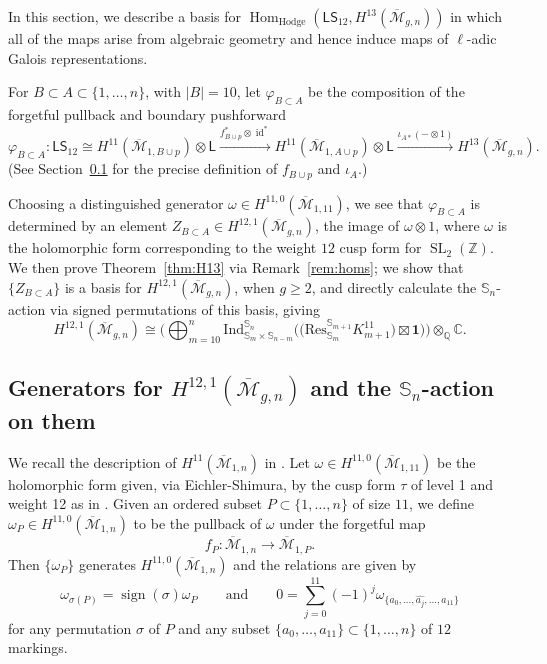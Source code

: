 \documentclass[12pt]{amsart}
\theoremstyle{definition}
\numberwithin{equation}{section}
\newcommand{\s}{\mathsf{S}}
\renewcommand{\l}{\mathsf{L}}
\newcommand{\zz}{\mathbb{Z}}
\renewcommand{\ss}{\mathbb{S}}
\newcommand{\M}{\mathcal{M}}
\DeclareMathOperator{\SL}{SL}
\DeclareMathOperator{\id}{id}
\DeclareMathOperator{\Hom}{Hom}
\DeclareMathOperator{\sign}{sign}
\newcommand{\CC}{\mathbb{C}}
\newcommand{\Q}{\mathbb{Q}}
\newcommand{\Ind}{\mathrm{Ind}}
\newcommand{\lstw}{\mathsf{L}\mathsf{S}_{12}}
\newcommand{\Mb}{\overline{\M}}
\theoremstyle{definition} %
\theoremstyle{remark}
\begin{document}
In this section, we describe a basis for $\Hom_{\mathrm{Hodge}}(\l \s_{12}, H^{13}(\Mb_{g,n}))$ in which all of the maps arise from algebraic geometry and hence induce maps of $\ell$-adic Galois representations. 

For $B \subset A \subset \{1, \ldots, n\}$, with $|B| = 10$, let $\varphi_{B \subset A}$ be the composition of the forgetful pullback and boundary pushforward 
\begin{equation} \label{dba} 
\varphi_{B \subset A} \colon \lstw \cong  H^{11}(\Mb_{1,B \cup p}) \otimes \mathsf{L} \xrightarrow{f_{B \cup p}^* \otimes \id^*} H^{11}(\Mb_{1,A \cup p}) \otimes \mathsf{L} \xrightarrow{\iota_{A*}( - \otimes 1)} H^{13}(\Mb_{g,n}).
\end{equation}
(See Section~\ref{candidate} for the precise definition of $f_{B \cup p}$ and $\iota_A$.) 

Choosing a distinguished generator $\omega \in H^{11,0}(\Mb_{1,11})$, we see that $\varphi_{B \subset A}$ is determined by an element $Z_{B \subset A} \in H^{12,1}(\Mb_{g,n})$, the image of $\omega \otimes 1$, where $\omega$ is the holomorphic form corresponding to the weight $12$ cusp form for $\SL_2(\zz)$. We then prove Theorem~\ref{thm:H13} via Remark~\ref{rem:homs}; we show that $\{ Z_{B \subset A} \}$ is a basis for $H^{12,1}(\Mb_{g,n})$, when $g \geq 2$, and directly calculate the $\ss_n$-action via signed permutations of this basis, giving $$H^{12,1}(\Mb_{g,n}) \cong \bigg ( \bigoplus_{m = 10}^n \Ind_{\ss_m \times \ss_{n-m}}^{\ss_n} \Big(\big(\mathrm{Res}^{\ss_{m+1}}_{\ss_m}K^{11}_{m+1}\big) \boxtimes \mathbf{1}\Big) \bigg) \otimes_\Q \CC.$$


\subsection{Generators for \texorpdfstring{$H^{12,1}(\Mb_{g,n})$ and the $\mathbb{S}_n$-action on them}{H13}}\label{candidate}
We recall the description of $H^{11}(\Mb_{1,n})$ in \cite[Proposition 2.3]{CanningLarsonPayne}. Let $\omega \in H^{11,0}(\Mb_{1,11})$ be the holomorphic form given, via Eichler-Shimura, by the cusp form $\tau$ of level 1 and weight 12 as in \cite[\S2]{FaberPandharipande13}. Given an ordered subset $P \subset \{1, \ldots, n\}$ of size $11$, we define $\omega_{P} \in H^{11,0}(\Mb_{1, n})$ to be the pullback of $\omega$ under the forgetful map \[f_P \colon \Mb_{1,n} \to \Mb_{1,P}.
\]
Then $\{\omega_P\}$ generates $H^{11,0}(\Mb_{1,n})$ and the relations are given by
\begin{equation} \label{h11rels} \omega_{\sigma(P)} = \sign(\sigma) \omega_P \qquad \text{and} \qquad 0 = \sum_{j = 0}^{11}(-1)^j \omega_{\{a_0, \ldots, \widehat{a_j}, \ldots, a_{11}\}}
\end{equation}
for any permutation $\sigma$ of $P$ and any subset $\{a_0, \ldots, a_{11}\} \subset \{1, \ldots, n\}$ of $12$ markings.
\end{document}
